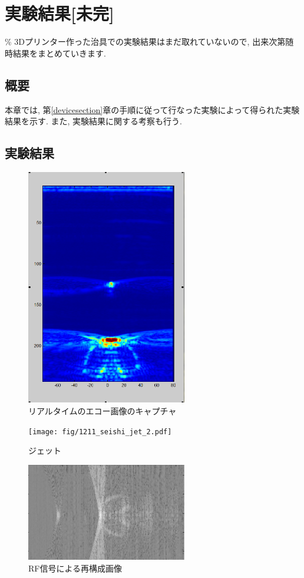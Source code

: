 \chapter{実験結果[未完]\label{experimentalresults}}
\% 3Dプリンター作った治具での実験結果はまだ取れていないので, 出来次第随時結果をまとめていきます. 
\newpage
\section{概要}
本章では, 第\ref{devicesection}章の手順に従って行なった実験によって得られた実験結果を示す. また, 実験結果に関する考察も行う. 
\section{実験結果}
\begin{figure}[H]
  \begin{center}
    \includegraphics[width=70mm]{fig/1213_seishi_echo.pdf}
  \end{center}
  \caption{リアルタイムのエコー画像のキャプチャ}
\end{figure}
\begin{figure}[H]
  \begin{center}
    \texttt{[image: fig/1211\_seishi\_jet\_2.pdf]}
  \end{center}
  \caption{ジェット}
\end{figure}
\begin{figure}[H]
  \begin{center}
    \includegraphics[width=70mm]{fig/1211seishi.pdf}
  \end{center}
  \caption{RF信号による再構成画像}
\end{figure}